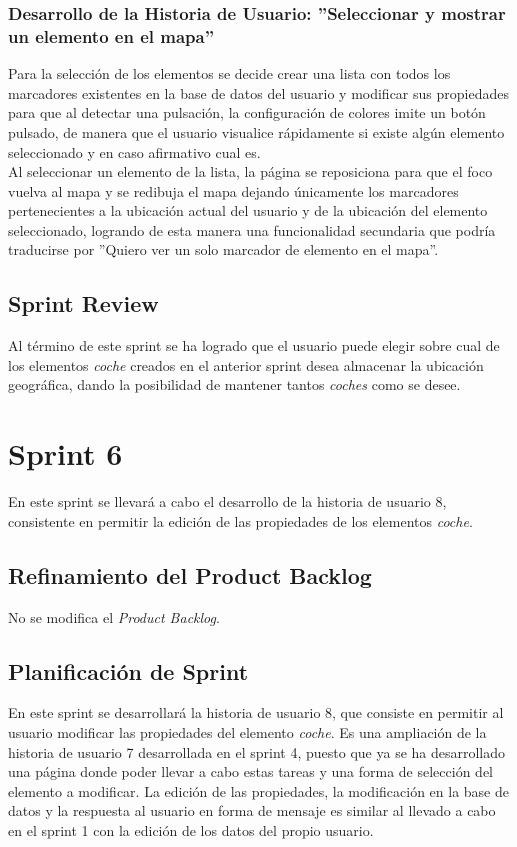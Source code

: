 	\subsubsection{Desarrollo de la Historia de Usuario: ''Seleccionar y mostrar un elemento en el mapa''}
	Para la selección de los elementos se decide crear una lista con todos los marcadores existentes en la base de datos del usuario y modificar sus propiedades para que al detectar una pulsación, la configuración de colores imite un botón pulsado, de manera que el usuario visualice rápidamente si existe algún elemento seleccionado y en caso afirmativo cual es. \\
	Al seleccionar un elemento de la lista, la página se reposiciona para que el foco vuelva al mapa y se redibuja el mapa dejando únicamente los marcadores pertenecientes a la ubicación actual del usuario y de la ubicación del elemento seleccionado, logrando de esta manera una funcionalidad secundaria que podría traducirse por ''Quiero ver un solo marcador de elemento en el mapa''.\\
			
	\subsection{Sprint Review}
	Al término de este sprint se ha logrado que el usuario puede elegir sobre cual de los elementos \textit{coche} creados en el anterior sprint desea almacenar la ubicación geográfica, dando la posibilidad de mantener tantos \textit{coches} como se desee.

\section{Sprint 6}
	En este sprint se llevará a cabo el desarrollo de la historia de usuario 8, consistente en permitir la edición de las propiedades de los elementos \textit{coche}.
	\subsection{Refinamiento del Product Backlog}
	No se modifica el \textit{Product Backlog}.
	
	\subsection{Planificación de Sprint}
	En este sprint se desarrollará la historia de usuario 8, que consiste en permitir al usuario modificar las propiedades del elemento \textit{coche}. Es una ampliación de la historia de usuario 7 desarrollada en el sprint 4, puesto que ya se ha desarrollado una página donde poder llevar a cabo estas tareas y una forma de selección del elemento a modificar. La edición de las propiedades, la modificación en la base de datos y la respuesta al usuario en forma de mensaje es similar al llevado a cabo en el sprint 1 con la edición de los datos del propio usuario.
	
